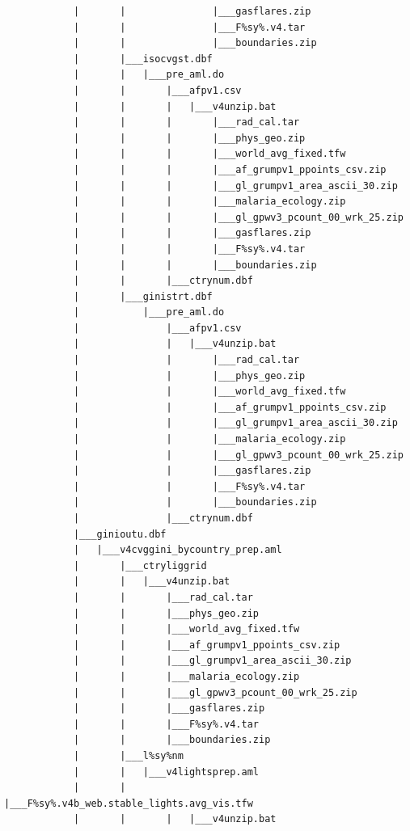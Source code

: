\documentclass[]{book}
\begin{document}
\begin{verbatim}
            |       |               |___gasflares.zip
            |       |               |___F%sy%.v4.tar
            |       |               |___boundaries.zip
            |       |___isocvgst.dbf
            |       |   |___pre_aml.do
            |       |       |___afpv1.csv
            |       |       |   |___v4unzip.bat
            |       |       |       |___rad_cal.tar
            |       |       |       |___phys_geo.zip
            |       |       |       |___world_avg_fixed.tfw
            |       |       |       |___af_grumpv1_ppoints_csv.zip
            |       |       |       |___gl_grumpv1_area_ascii_30.zip
            |       |       |       |___malaria_ecology.zip
            |       |       |       |___gl_gpwv3_pcount_00_wrk_25.zip
            |       |       |       |___gasflares.zip
            |       |       |       |___F%sy%.v4.tar
            |       |       |       |___boundaries.zip
            |       |       |___ctrynum.dbf
            |       |___ginistrt.dbf
            |           |___pre_aml.do
            |               |___afpv1.csv
            |               |   |___v4unzip.bat
            |               |       |___rad_cal.tar
            |               |       |___phys_geo.zip
            |               |       |___world_avg_fixed.tfw
            |               |       |___af_grumpv1_ppoints_csv.zip
            |               |       |___gl_grumpv1_area_ascii_30.zip
            |               |       |___malaria_ecology.zip
            |               |       |___gl_gpwv3_pcount_00_wrk_25.zip
            |               |       |___gasflares.zip
            |               |       |___F%sy%.v4.tar
            |               |       |___boundaries.zip
            |               |___ctrynum.dbf
            |___ginioutu.dbf
            |   |___v4cvggini_bycountry_prep.aml
            |       |___ctryliggrid
            |       |   |___v4unzip.bat
            |       |       |___rad_cal.tar
            |       |       |___phys_geo.zip
            |       |       |___world_avg_fixed.tfw
            |       |       |___af_grumpv1_ppoints_csv.zip
            |       |       |___gl_grumpv1_area_ascii_30.zip
            |       |       |___malaria_ecology.zip
            |       |       |___gl_gpwv3_pcount_00_wrk_25.zip
            |       |       |___gasflares.zip
            |       |       |___F%sy%.v4.tar
            |       |       |___boundaries.zip
            |       |___l%sy%nm
            |       |   |___v4lightsprep.aml
            |       |       |___F%sy%.v4b_web.stable_lights.avg_vis.tfw
            |       |       |   |___v4unzip.bat

\end{verbatim}
\end{document}
